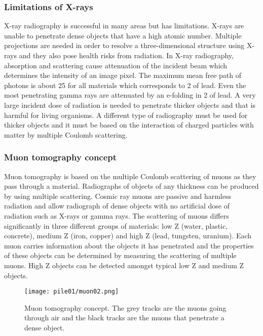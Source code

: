\documentclass[twoside,titlepage,11pt,twocolumn,a4paper]{article}
\begin{document}
\subsubsection{Limitations of X-rays}
X-ray radiography is successful in many areas but has
limitations. X-rays are unable to penetrate dense objects that have a
high atomic number. Multiple projections are needed in order to
resolve a three-dimensional structure using X-rays and they also pose
health risks from radiation. In X-ray radiography, absorption and
scattering cause attenuation of the incident beam which determines the
intensity of an image pixel. The maximum mean free path of photons is
about \unit{25}{\gram\usk\rpsquare{\centi\metre}} for all materials
which corresponds to \unit{2}{\centi\metre} of lead.
\citep{Borozdin2003} Even the most penetrating gamma rays are
attenuated by an e-folding in \unit{2}{\centi\metre} of lead. A very
large incident dose of radiation is needed to penetrate thicker
objects and that is harmful for living organisms.
\citep{Priedhorsky2003} A different type of radiography must be used
for thicker objects and it must be based on the interaction of charged
particles with matter by multiple Coulomb scattering.
\citep{Borozdin2003}

\subsubsection{Muon tomography concept}
Muon tomography is based on the multiple Coulomb scattering of muons
as they pass through a material. Radiographs of objects of any
thickness can be produced by using multiple scattering.  Cosmic ray
muons are passive and harmless radiation and allow radiograph of dense
objects with no artificial dose of radiation such as X-rays or gamma
rays. The scattering of muons differs significantly in three different
groups of materials: low Z (water, plastic, concrete), medium Z (iron,
copper) and high Z (lead, tungsten, uranium). \citep{imageRec2004} Each
muon carries information about the objects it has penetrated and the
properties of these objects can be determined by measuring the
scattering of multiple muons. High Z objects can be detected amongst
typical low Z and medium Z objects. \citep{statisticalRec2007}

\begin{figure}
  \texttt{[image: pile01/muon02.png]}
  \caption{Muon tomography concept. The grey tracks are the muons
    going through air and the black tracks are the muons that
    penetrate a dense object. \citep{statisticalRec2007}}
  \label{fig:muon02}
\end{figure}
\end{document}
